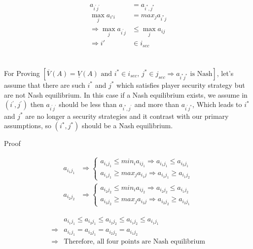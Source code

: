 \documentclass[
  course = {{IE579 Game Theory and Multi-Agent Reinforcement Learning}},
  quartile = {{4}},
  assignment = 2,
  name = {{Mohammad Mahdi Rahimi}},
  studentnumber = {{20208244}},
  email = {{mahi@kaist.ac.kr}},
  firstexercise = 1
]{aga-homework}
\begin{document}
\begin{equation}
    \begin{split}
        a_{i^\prime j^\prime} & = a_{i^*, j^*} \\
        \max_j{a_{i\prime i}} & = max_j{a_{i^* j}}\\
        \Rightarrow \max_j{a_{i^\prime j}} & \le \max_j{a_{ij}}\\
        \Rightarrow i\prime & \in i_{sec}
    \end{split}
\end{equation}
\\
\\
For Proving $[\overline{V}(A) = \underline{V}(A)\text{ and  } i^* \in i_{sec}\text{, } j^* \in j_{sec} \Rightarrow a_{i^* j^* }\text{ is Nash}]$, let's assume that there are such $i^*$ and $j^*$ which satisfies player security strategy but are not Nash equilibrium. In this case if a Nash equilibrium exists, we assume in $(i^\prime, j^\prime)$ then $a_{i^\prime j^\prime}$ should be less than $a_{i^*, j^\prime}$ and more than $a_{i^\prime j^*}$, Which leads to $i^*$ and $j^*$ are no longer a security strategies and it contrast with our primary assumptions, so $(i^*, j^*)$ should be a Nash equilibrium.

\subexercise Proof

\begin{equation}
    \begin{split}
        a_{i_1j_1} & \Rightarrow \begin{cases}
        a_{i_1j_1} \le min_i{a_{ij_1}} \Rightarrow a_{i_1j_1} \le a_{i_2j_1}\\
        a_{i_1j_1} \ge max_j{a_{i_1j}} \Rightarrow a_{i_1j_1} \ge a_{i_1j_2}
        \end{cases}\\
        a_{i_2j_2} & \Rightarrow \begin{cases}
        a_{i_2j_2} \le min_i{a_{ij_2}} \Rightarrow a_{i_2j_2} \le a_{i_1j_2}\\
        a_{i_2j_2} \ge max_j{a_{i_2j}} \Rightarrow a_{i_2j_2} \ge a_{i_2j_1}
        \end{cases}
    \end{split}
\end{equation}

\begin{equation}
    \begin{split}
         & a_{i_1j_1} \le  a_{i_2j_1} \le  a_{i_2j_2} \le  a_{i_1j_2} \le  a_{i_1j_1}\\
         \Rightarrow & a_{i_1j_1} =  a_{i_2j_1} =  a_{i_2j_2} =  a_{i_1j_2}\\
         \Rightarrow & \text{Therefore, all four points are Nash equilibrium}
    \end{split}
\end{equation}
\end{document}
